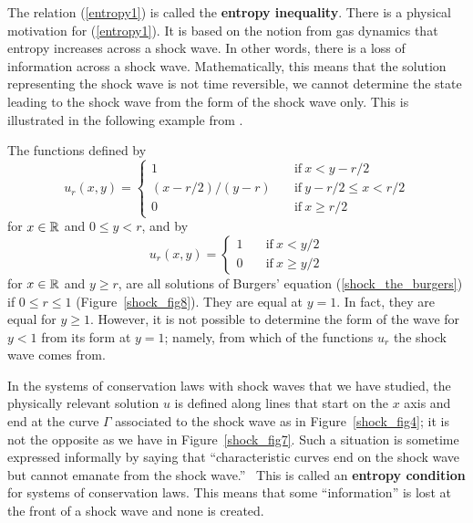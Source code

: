 The relation (\ref{entropy1}) is called the
{\bfseries entropy inequality}.
There is a physical motivation for (\ref{entropy1}).  It is based on
the notion from gas dynamics that entropy increases across a shock
wave.  In other words, there is a loss of information across a shock
wave.  Mathematically, this means that the solution representing the
shock wave is not time reversible, we cannot determine the state
leading to the shock wave from the form of the shock wave only. 
This is illustrated in the following example from \cite{Smo}.

\begin{egg}
The functions defined by
\[
u_r(x,y) =
\begin{cases}
1 & \quad \text{if} \ x < y - r/2 \\
(x-r/2)/(y-r) & \quad \text{if} \ y - r/2 \leq x < r/2 \\
0 & \quad \text{if} \ x \geq r/2
\end{cases}
\]
for $x \in \mathbb{R}$ and $0 \leq y < r$, and by
\[
u_r(x,y) =
\begin{cases}
1 & \quad \text{if} \ x < y/2 \\
0 & \quad \text{if} \ x \geq y/2
\end{cases}
\]
for $x \in \mathbb{R}$ and $y \geq r$, are all solutions of
Burgers' equation (\ref{shock_the_burgers}) if $0 \leq r \leq 1$
(Figure~\ref{shock_fig8}).  They are equal at $y = 1$.  In
fact, they are equal for $y \geq 1$.  However, it is not possible to
determine the form of the wave for $y <1$ from its form at $y=1$;
namely, from which of the functions $u_r$ the shock wave comes from.
\end{egg}


In the systems of conservation laws with shock waves that we have studied, the
physically relevant solution $u$ is defined along lines that start on
the $x$ axis and end at the curve $\Gamma$ associated to the shock wave
as in Figure~\ref{shock_fig4}; it is not the opposite as we have in
Figure~\ref{shock_fig7}.  Such a situation
is sometime expressed informally by saying that ``characteristic
curves end on the shock wave but cannot emanate from the shock
wave.'' \  This is called an {\bfseries entropy
condition} for
systems of conservation laws.  This means that some ``information'' is
lost at the front of a shock wave and none is created.


